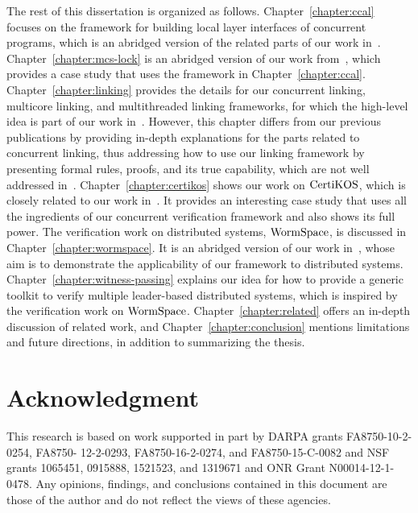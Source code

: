 The rest of this dissertation is organized as follows. 
Chapter~\ref{chapter:ccal}  focuses on the framework for building local layer interfaces of concurrent programs, 
which is an abridged version of the related parts of our work in~\cite{concurrency}.
Chapter~\ref{chapter:mcs-lock} is an abridged version of our work from~\cite{mcslock}, 
which provides a case study that uses the framework in Chapter~\ref{chapter:ccal}. 
Chapter~\ref{chapter:linking} provides the details for our concurrent linking, multicore linking, and multithreaded linking frameworks, 
for which the high-level idea is part of our work in~\cite{concurrency}.
However, this chapter differs from our previous publications by providing in-depth explanations for the parts related to concurrent linking, thus addressing how to use our linking framework by presenting formal rules, proofs, and its true capability, 
which are not well addressed in~\cite{concurrency}. 
Chapter~\ref{chapter:certikos}  shows our work on $\mathrm{CertiKOS}$, which is closely related to our work in~\cite{certikos:osdi16}. 
It provides an interesting case study that uses all the ingredients of our concurrent verification framework and also shows its full power. 
The verification work on distributed systems, $\mathrm{WormSpace}$, is discussed in Chapter~\ref{chapter:wormspace}. 
It is an abridged version of our work in~\cite{wormspace}, whose aim is to demonstrate the applicability of our framework to distributed systems. 
Chapter~\ref{chapter:witness-passing}  explains our idea for how to provide a generic toolkit to verify multiple leader-based distributed systems, 
which is inspired by the verification work on $\mathrm{WormSpace}$. 
Chapter~\ref{chapter:related} offers an in-depth discussion of related work, 
and Chapter~\ref{chapter:conclusion}   mentions limitations and future directions, in addition to summarizing the thesis.



\section{Acknowledgment}
This research is based on work supported in part by DARPA grants FA8750-10-2-0254, FA8750- 12-2-0293, FA8750-16-2-0274, and FA8750-15-C-0082 and NSF grants 1065451, 0915888, 1521523, and 1319671 and ONR Grant N00014-12-1-0478. Any opinions, findings, and conclusions contained in this document are those of the author and do not reflect the views of these agencies.

